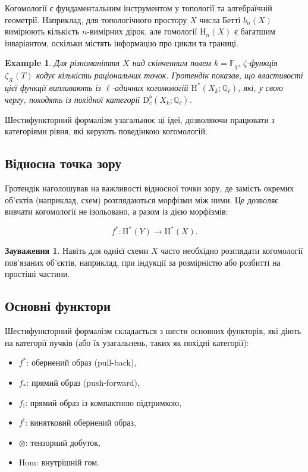 \documentclass{article}
\theoremstyle{plain}
\newtheorem{example}{Example}
\theoremstyle{definition}
\newtheorem{remark}{Зауваження}[section]
\begin{document}
Когомології є фундаментальним інструментом у топології та алгебраїчній геометрії. Наприклад, для топологічного простору \( X \) числа Бетті \( b_n(X) \) вимірюють кількість \( n \)-вимірних дірок, але гомології \( \mathrm{H}_n(X) \) є багатшим інваріантом, оскільки містять інформацію про цикли та границі.

\begin{example}
Для різноманіття \( X \) над скінченним полем \( k = \mathbb{F}_q \), \(\zeta\)-функція \( \zeta_X(T) \) кодує кількість раціональних точок. Гротендік показав, що властивості цієї функції випливають із \(\ell\)-адичних когомологій \( \mathrm{H}^*(X_{\bar{k}}; \mathbb{Q}_\ell) \), які, у свою чергу, походять із похідної категорії \( \mathrm{D}_c^b(X_{\bar{k}}; \mathbb{Q}_\ell) \).
\end{example}

Шестифункторний формалізм узагальнює ці ідеї, дозволяючи працювати з категоріями рівня, які керують поведінкою когомологій.

\subsection{Відносна точка зору}

Гротендік наголошував на важливості відносної точки зору, де замість окремих об’єктів (наприклад, схем) розглядаються морфізми між ними. Це дозволяє вивчати когомології не ізольовано, а разом із дією морфізмів:

\[
f^*: \mathrm{H}^*(Y) \to \mathrm{H}^*(X).
\]

\begin{remark}
Навіть для однієї схеми \( X \) часто необхідно розглядати когомології пов’язаних об’єктів, наприклад, при індукції за розмірністю або розбитті на простіші частини.
\end{remark}

\subsection{Основні функтори}

Шестифункторний формалізм складається з шести основних функторів, які діють на категорії пучків (або їх узагальнень, таких як похідні категорії):

\begin{itemize}
    \item \( f^* \): обернений образ (pull-back),
    \item \( f_* \): прямий образ (push-forward),
    \item \( f_! \): прямий образ із компактною підтримкою,
    \item \( f^! \): винятковий обернений образ,
    \item \( \otimes \): тензорний добуток,
    \item \( \underline{\mathrm{Hom}} \): внутрішній гом.
\end{itemize}
\end{document}
